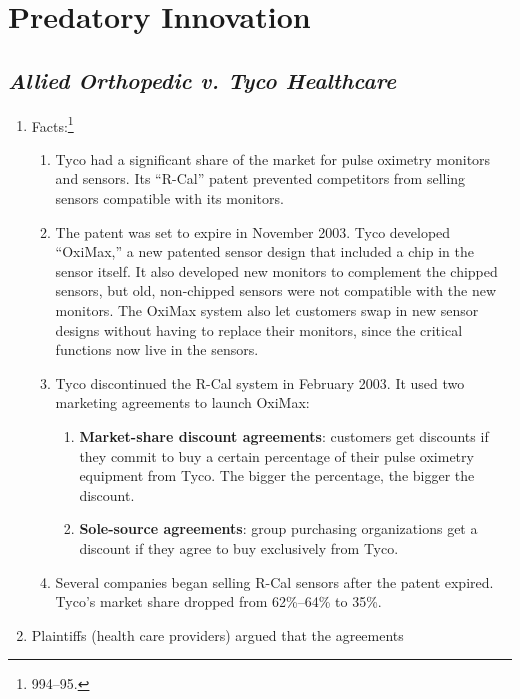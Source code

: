\section{Predatory Innovation}

\subsection{\emph{Allied Orthopedic v. Tyco Healthcare}}

\begin{enumerate}
    \item Facts:\footnote{994--95.}
    \begin{enumerate}
        \item Tyco had a significant share of the market for pulse oximetry 
        monitors and sensors. Its ``R-Cal'' patent prevented competitors from 
        selling sensors compatible with its monitors.
        \item The patent was set to expire in November 2003. Tyco developed 
        ``OxiMax,'' a new patented sensor design that included a chip in the 
        sensor itself. It also developed new monitors to complement the 
        chipped sensors, but old, non-chipped sensors were not compatible with 
        the new monitors. The OxiMax system also let customers swap in new 
        sensor designs without having to replace their monitors, since the 
        critical functions now live in the sensors.
        \item Tyco discontinued the R-Cal system in February 2003. It used two 
        marketing agreements to launch OxiMax:
        \begin{enumerate}
            \item \textbf{Market-share discount agreements}: customers get 
            discounts if they commit to buy a certain percentage of their 
            pulse oximetry equipment from Tyco. The bigger the percentage, the 
            bigger the discount.
            \item \textbf{Sole-source agreements}: group purchasing 
            organizations get a discount if they agree to buy exclusively from 
            Tyco.
        \end{enumerate}
        \item Several companies began selling R-Cal sensors after the patent 
        expired. Tyco's market share dropped from 62\%--64\% to 35\%.
    \end{enumerate}
    \item Plaintiffs (health care providers) argued that the agreements 

\end{enumerate}
